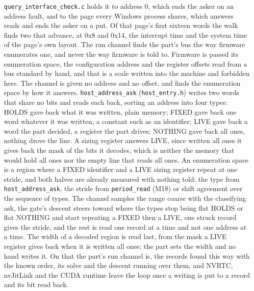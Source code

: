 \begin{enumerate}
\texttt{query\_\allowbreak{}interface\_\allowbreak{}check.\allowbreak{}c} holds it to address 0, which ends the asker on an address fault, and to the page every Windows process shares, which answers reads and ends the asker on a put. Of that page's first sixteen words the walk finds two that advance, at 0x8 and 0x14, the interrupt time and the system time of the page's own layout. The run channel finds the part's bus the way firmware enumerates one, and never the way firmware is told to. Firmware is passed its enumeration space, the configuration address and the register offsets read from a bus standard by hand, and that is a scale written into the machine and forbidden here. The channel is given no address and no offset, and finds the enumeration space by how it answers. \texttt{host\_\allowbreak{}address\_\allowbreak{}ask} (\texttt{host\_\allowbreak{}entry.\allowbreak{}h}) writes two words that share no bits and reads each back, sorting an address into four types: HOLDS gave back what it was written, plain memory; FIXED gave back one word whatever it was written, a constant such as an identifier; LIVE gave back a word the part decided, a register the part drives; NOTHING gave back all ones, nothing drove the line. A sizing register answers LIVE, since written all ones it gives back the mask of the bits it decodes, which is neither the memory that would hold all ones nor the empty line that reads all ones. An enumeration space is a region where a FIXED identifier and a LIVE sizing register repeat at one stride, and both halves are already measured with nothing told: the type from \texttt{host\_\allowbreak{}address\_\allowbreak{}ask}, the stride from \texttt{period\_\allowbreak{}read} (M18) or shift agreement over the sequence of types. The channel samples the range coarse with the classifying ask, the gate's descent steers toward where the types stop being flat HOLDS or flat NOTHING and start repeating a FIXED then a LIVE, one struck record gives the stride, and the rest is read one record at a time and not one address at a time. The width of a decoded region is read last, from the mask a LIVE register gives back when it is written all ones: the part sets the width and no hand writes it. On that the part's run channel is, the records found this way with the known order, its solve and the descent running over them, and NVRTC, nvJitLink and the CUDA runtime leave the loop once a writing is put to a record and its bit read back.


\end{enumerate}
